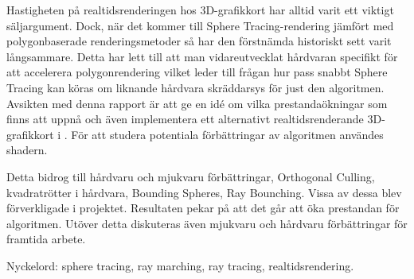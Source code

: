 	Hastigheten på realtidsrenderingen hos 3D-grafikkort har alltid varit ett
	viktigt säljargument. Dock, när det kommer till Sphere Tracing-rendering
	jämfört med polygonbaserade renderingsmetoder så har den förstnämda
	historiskt sett varit långsammare. Detta har lett till att man
	vidareutvecklat hårdvaran specifikt för att accelerera polygonrendering
	vilket leder till frågan hur pass snabbt Sphere Tracing kan köras om liknande
	hårdvara skräddarsys för just den algoritmen. Avsikten med denna rapport är
	att ge en idé om vilka prestandaökningar som finns att uppnå och även implementera ett
	alternativt realtidsrenderande 3D-grafikkort i \clash. För att studera potentiala 
	förbättringar av algoritmen användes shadern.
	
	Detta bidrog till hårdvaru och mjukvaru förbättringar, Orthogonal Culling, 
	kvadratrötter i hårdvara, Bounding Spheres, Ray Bounching. Vissa av dessa blev 
	förverkligade i projektet. Resultaten pekar på att det går att öka prestandan 
	för algoritmen. Utöver detta diskuteras även mjukvaru och hårdvaru 
	förbättringar för framtida arbete.

	\vfill
	Nyckelord: sphere tracing, ray marching, ray tracing, realtidsrendering.


\newpage
\thispagestyle{empty}
\mbox{}
